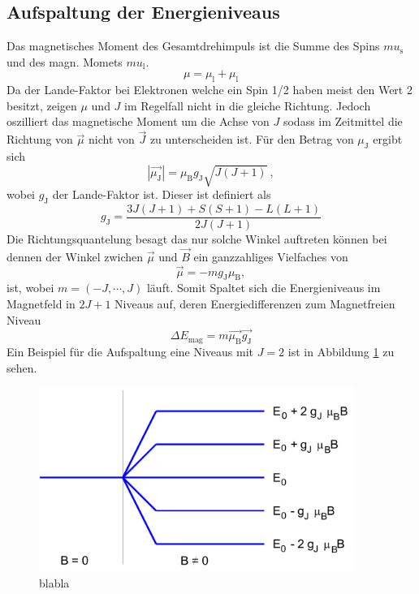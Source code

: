 \subsection{Aufspaltung der Energieniveaus}
Das magnetisches Moment des Gesamtdrehimpuls ist die Summe des Spins $mu_\text{s}$ und des magn. Momets $mu_\text{l}$.
\begin{equation}
  \mu = \mu_\text{l} + \mu_\text{l}
\end{equation}
Da der Lande-Faktor bei Elektronen welche ein Spin 1/2 haben meist den Wert 2 besitzt, zeigen $\mu$ und $J$ im Regelfall nicht in die gleiche Richtung. Jedoch oszilliert das magnetische Moment um die Achse von $J$ sodass im Zeitmittel die Richtung von $\vec{\mu}$ nicht von $\vec{J}$ zu unterscheiden ist. Für den Betrag von $\mu_\text{J}$ ergibt sich
\begin{equation}
  |\vec{\mu_\text{J}}| = \mu_\text{B} g_\text{J} \sqrt{J(J+1)} \ ,
  \label{eqn:muJ}
\end{equation}
wobei $g_\text{J}$ der Lande-Faktor ist. Dieser ist definiert als
\begin{equation}
  g_\text{J} = \frac{3J(J+1) + S(S+1) -L(L+1)}{2J(J+1)}
  \label{eqn:Lan}
\end{equation}
Die Richtungsquantelung besagt das nur solche Winkel auftreten können bei dennen der Winkel zwichen $\vec{\mu}$ und $\vec{B}$ ein ganzzahliges Vielfaches von
\begin{equation}
\vec{\mu} = -m g_\text{J} \mu_\text{B},
  \label{eqn:mu}
\end{equation}
ist, wobei  $m  = (-J, \cdots, J)$ läuft. Somit Spaltet sich die Energieniveaus im Magnetfeld in $2J+1$ Niveaus auf, deren Energiedifferenzen zum Magnetfreien Niveau
\begin{equation}
	\Delta E_\text{mag} = m \vec{\mu_\text{B}} \vec{g_\text{J}}
  \label{eqn:delE}
\end{equation}
Ein Beispiel für die Aufspaltung eine Niveaus mit $J=2$ ist in Abbildung \ref{fig:Eniv} zu sehen.
\begin{figure}
  \centering
  \includegraphics[height=6cm]{./Bilder/ENiveaus.png}
  \caption{blabla}
   \label{fig:Eniv}
\end{figure}

